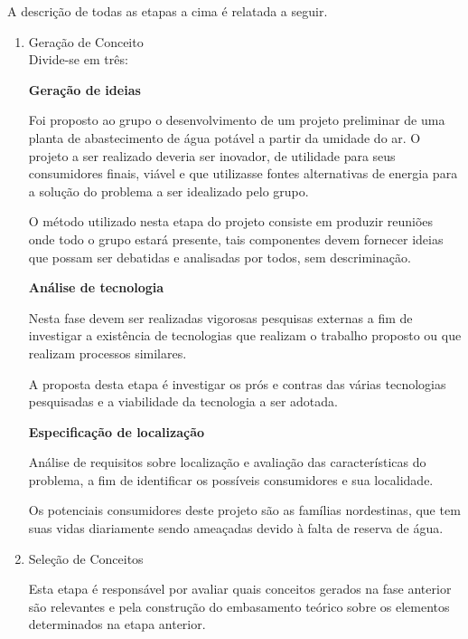  A descrição de todas as etapas a cima é relatada a seguir.
  
  \begin{enumerate}
   \parindent=1.25cm
   
   \item Geração de Conceito\\
      
      \noindent
      Divide-se em três:
      
      \noindent
      \subitem \textbf{Geração de ideias}
      
      Foi proposto ao grupo o desenvolvimento de um projeto preliminar de uma planta de abastecimento de água potável a partir 
      da umidade do ar. O projeto a ser realizado deveria ser inovador, de utilidade para seus consumidores finais, viável e
      que utilizasse fontes alternativas de energia para a solução do problema a ser idealizado pelo grupo.
      
      O método utilizado nesta etapa do projeto consiste em produzir reuniões onde todo o grupo estará presente, tais componentes 
      devem fornecer ideias que possam ser debatidas e analisadas por todos, sem descriminação.
      
      \noindent
      \subitem \textbf{Análise de tecnologia}
      
      Nesta fase devem ser realizadas vigorosas pesquisas externas a fim de investigar a existência de tecnologias que realizam o
      trabalho proposto ou que realizam processos similares. 
	    
      A proposta desta etapa é investigar os prós e contras das várias tecnologias pesquisadas e a viabilidade da tecnologia 
      a ser adotada.
      
      \noindent
      \subitem \textbf{Especificação de localização}
      
      Análise de requisitos sobre localização e avaliação das características do problema, a fim de identificar os possíveis 
      consumidores e sua localidade. 
      
      Os potenciais consumidores deste projeto são as famílias nordestinas, que tem suas vidas diariamente sendo ameaçadas 
      devido à falta de reserva de água.
   
  \item Seleção de Conceitos
  
    Esta etapa é responsável por avaliar quais conceitos gerados na fase anterior são relevantes e pela construção do
    embasamento teórico sobre os elementos determinados na etapa anterior. 
  

\end{enumerate}
